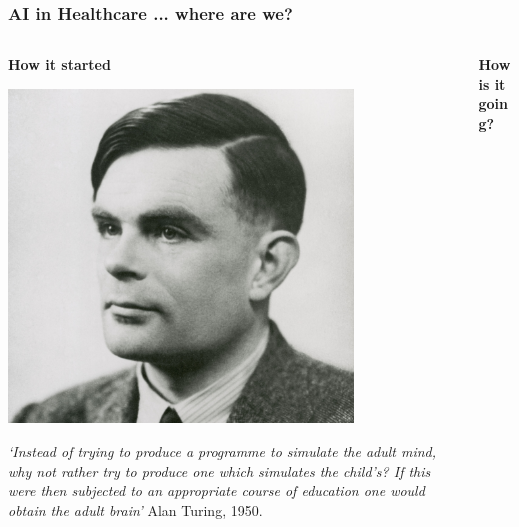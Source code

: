 \begin{frame}
\frametitle{AI in Healthcare ... where are we?}
\pause
\begin{columns}
    \begin{column}{0.5\textwidth}
    \begin{center}
        \textbf{How it started}\\
        \vspace{2mm}
        
        \includegraphics[width=0.77\textwidth]{./images/alan_turing.jpg}
        
        \footnotesize{\textit{`Instead of trying to produce a programme to simulate the adult mind, why not rather try to produce one which simulates the child’s? If this were then subjected to an appropriate course of education one would obtain the adult brain'} Alan Turing, 1950.}
        
    \end{center}
        
    \end{column}
\pause

    \begin{column}{0.48\textwidth}
    \begin{center}
    \textbf{How is it going?}\\
    \vspace{2mm}
        

\end{center}
\end{column}
\end{columns}
\end{frame}
